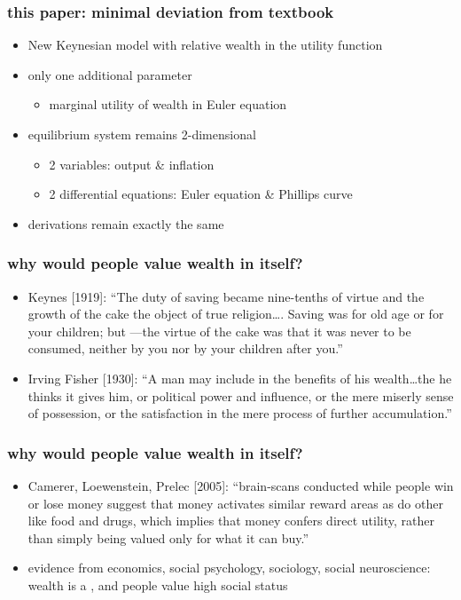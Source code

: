 \documentclass[12pt,xcolor={dvipsnames},hyperref={pdftex,pdfpagemode=UseNone,hidelinks,pdfdisplaydoctitle=true},usepdftitle=false]{beamer}
\begin{document}
\begin{frame}
\frametitle{this paper: minimal deviation from textbook}
\begin{itemize}
\item New Keynesian model with relative wealth in the utility function
\item only one additional parameter
\begin{itemize}
\item marginal utility of wealth in Euler equation
\end{itemize}
\item[\then] equilibrium system remains 2-dimensional
\begin{itemize}
\item 2 variables: output \& inflation
\item 2 differential equations: Euler equation \& Phillips curve
\end{itemize}
\item[\then] derivations remain exactly the same
\end{itemize}
\end{frame}

\begin{frame}
\frametitle{why would people value wealth in itself?}
\begin{itemize}
\item Keynes [1919]: ``The duty of saving became nine-tenths of virtue and the growth of the cake the object of true religion\ldots. Saving was for old age or for your children; but ---the virtue of the cake was that it was never to be consumed, neither by you nor by your children after you.''
\item Irving Fisher [1930]: ``A man may include in the benefits of his wealth\ldots the  he thinks it gives him, or political power and influence, or the mere miserly sense of possession, or the satisfaction in the mere process of further accumulation.'' 
\end{itemize}
\end{frame}

\begin{frame}
\frametitle{why would people value wealth in itself?}
\begin{itemize}
\item Camerer, Loewenstein, Prelec [2005]: ``brain-scans conducted while people win or lose money suggest that money activates similar reward areas as do other  like food and drugs, which implies that money confers direct utility, rather than simply being valued only for what it can buy.''
\item evidence from economics, social psychology, sociology, social neuroscience: wealth is a , and people value high social status
\end{itemize}
\end{frame}
\end{document}
